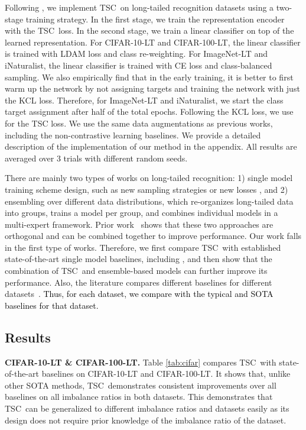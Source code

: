 \documentclass[10pt,twocolumn,letterpaper]{article}
\newcommand{\name} {TSC}
\newcommand{\red}[1]{\textcolor{black}{#1}}
\begin{document}
Following \cite{kang2019decoupling, kang2020exploring}, we implement \name~on long-tailed recognition datasets using a two-stage training strategy. In the first stage, we train the representation encoder with the \name~loss. In the second stage, we train a linear classifier on top of the learned representation. For CIFAR-10-LT and CIFAR-100-LT, the linear classifier is trained with LDAM loss and class re-weighting. For ImageNet-LT and iNaturalist, the linear classifier is trained with CE loss and class-balanced sampling. We also empirically find that in the early training, it is better to first warm up the network by not assigning targets and training the network with just the KCL loss. Therefore, for ImageNet-LT and iNaturalist, we start the class target assignment after half of the total epochs. Following the KCL loss, we use  for the TSC loss. We use the same data augmentations as previous works, including the non-contrastive learning baselines. We provide a detailed description of the implementation of our method in the appendix. All results are averaged over 3 trials with different random seeds.

There are mainly two types of works on long-tailed recognition: 1) single model training scheme design, such as new sampling strategies \cite{kang2019decoupling} or new losses \cite{cui2019class, cao2019learning, kang2020exploring}, and 2) ensembling over different data distributions, which re-organizes long-tailed data into groups, trains a model per group, and combines individual models in a multi-expert framework. Prior work~\cite{wang2020long} shows that these two approaches are orthogonal and can be combined together to improve performance. Our work falls in the first type of works. Therefore, we first compare \name~with  established state-of-the-art single model baselines, including \cite{cao2019learning, kang2019decoupling, kang2020exploring, kim2020m2m}, and then show that the combination of \name~and ensemble-based models can further improve its performance. Also, the literature compares different baselines for different datasets~\cite{yang2020rethinking,kang2020exploring,wang2020long}. \red{Thus, for each dataset, we compare with the typical and SOTA baselines for that dataset. }

\subsection{Results}

\textbf{CIFAR-10-LT \& CIFAR-100-LT.} Table \ref{tab:cifar} compares \name~with state-of-the-art baselines on CIFAR-10-LT and CIFAR-100-LT. It shows that, unlike other SOTA methods, \name~demonstrates consistent improvements over all baselines on all imbalance ratios in both datasets. This demonstrates that \name~can be generalized to different imbalance ratios and datasets easily as its design does not require prior knowledge of the imbalance ratio of the dataset.
\end{document}

